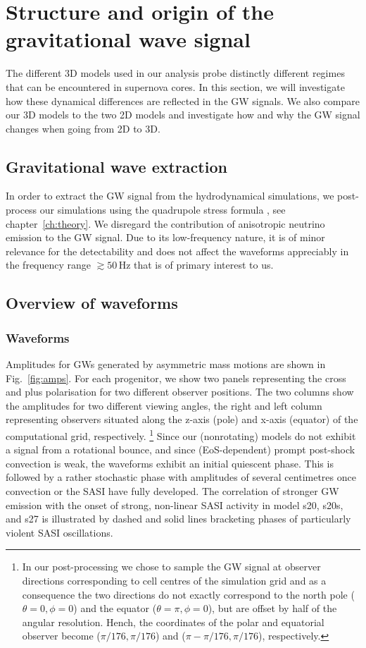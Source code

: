 \section{Structure and origin of the gravitational wave signal}
\label{sec:structure}
{The different 3D models used in our analysis probe distinctly
different regimes that can be encountered in supernova cores.
In this section, we will investigate how these dynamical differences are reflected
in the GW signals. We also compare our 3D models to the two 2D models and investigate
how and why the GW signal changes when going from 2D to 3D.}
\subsection{Gravitational wave extraction}
In order to extract the GW signal from
the hydrodynamical simulations, we post-process our simulations using
the quadrupole stress formula \citep{finn_89,nakamura_89,blanchet_90}, see
chapter~\ref{ch:theory}. 
We disregard the contribution of anisotropic neutrino
emission \citep{epstein_78} to the GW signal. Due
to its low-frequency nature, it is of minor relevance for the
detectability and does not affect the waveforms appreciably
in the frequency range $\gtrsim 50 \, \mathrm{Hz}$ that is of
primary interest to us.

\subsection{Overview of waveforms}
\subsubsection{Waveforms}
\label{sec:waveforms}
Amplitudes for GWs generated by asymmetric mass motions are shown in
Fig.~\ref{fig:amps}. For each progenitor, we show two panels
representing the cross and plus polarisation for two different
observer positions. The two columns show the amplitudes for two 
different viewing angles, the right and left column representing
observers situated along the z-axis (pole) and x-axis (equator) of the computational grid, respectively.
\footnote{In our post-processing we chose to sample the GW signal at observer directions corresponding to 
cell centres of the simulation grid and as a consequence the two directions do not exactly correspond to the
north pole ($\theta = 0, \phi = 0$) and the equator ($\theta = \pi, \phi = 0$), but are offset by half of the angular resolution.
Hench, the coordinates of the polar and equatorial observer become ($\pi/176,\pi/176$) 
and ($\pi - \pi/176,\pi/176$), respectively.}
Since our (nonrotating) models do not exhibit a signal from a rotational bounce,
and since (EoS-dependent) prompt post-shock convection is weak, 
the waveforms exhibit an initial quiescent phase. This is followed by a rather 
stochastic phase with amplitudes of several centimetres once convection or the SASI have fully developed. 
The correlation of stronger GW emission
with the onset of strong, non-linear SASI activity
in model s20, s20s, and s27 is illustrated
by dashed and solid lines bracketing phases of particularly
violent SASI oscillations.

